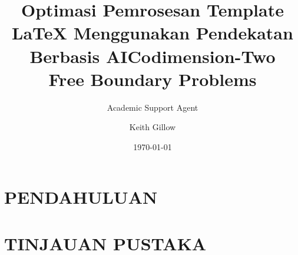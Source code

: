 \documentclass{ociamthesis}
\title{Optimasi Pemrosesan Template LaTeX Menggunakan Pendekatan Berbasis AI}
\author{Academic Support Agent}
\date{\today}
\begin{document}
\maketitle

\begin{abstract}

\end{abstract}

\chapter{PENDAHULUAN}


\chapter{TINJAUAN PUSTAKA}



\usepackage{amssymb}

%

\title{Codimension-Two\\[1ex]     %
        Free Boundary Problems}   %

\author{Keith Gillow}             %

\end{document}
